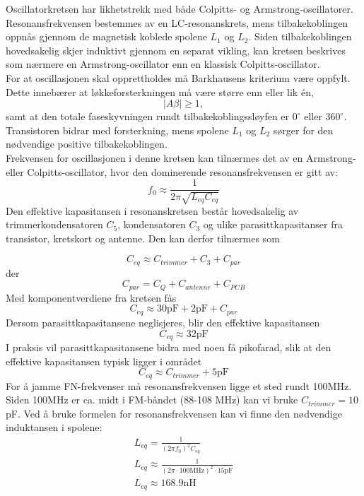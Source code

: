 \noindent
Oscillatorkretsen har likhetstrekk med både Colpitts- og Armstrong-oscillatorer. Resonansfrekvensen bestemmes av en LC-resonanskrets, mens tilbakekoblingen oppnås gjennom de magnetisk koblede spolene $L_1$ og $L_2$. Siden tilbakekoblingen hovedsakelig skjer induktivt gjennom en separat vikling, kan kretsen beskrives som nærmere en Armstrong-oscillator enn en klassisk Colpitts-oscillator.
\\[1em]
For at oscillasjonen skal opprettholdes må Barkhausens kriterium være oppfylt. 
Dette innebærer at løkkeforsterkningen må være større enn eller lik én,
\[
|A\beta| \geq 1,
\]
\noindent
samt at den totale faseskyvningen rundt tilbakekoblingssløyfen er \(0^\circ\) eller \(360^\circ\). Transistoren bidrar med forsterkning, mens spolene \(L_1\) og \(L_2\) sørger for den nødvendige positive tilbakekoblingen.
\\[1em]
Frekvensen for oscillasjonen i denne kretsen kan tilnærmes det av en Armstrong- eller Colpitts-oscillator, hvor den dominerende resonansfrekvensen er gitt av:
\[
f_0 \approx \frac{1}{2\pi \sqrt{L_{eq} C_{eq}}}
\]
\noindent
Den effektive kapasitansen i resonanskretsen består hovedsakelig av trimmerkondensatoren \(C_5\), kondensatoren \(C_3\) og ulike parasittkapasitanser fra transistor, kretskort og antenne. Den kan derfor tilnærmes som

\[
C_{eq} \approx C_{trimmer} + C_3 + C_{par}
\]
\noindent
der
\[
C_{par} = C_{Q} + C_{antenne} + C_{PCB}
\]
\noindent
Med komponentverdiene fra kretsen fås
\[
C_{eq} \approx 30\text{pF} + 2\text{pF} + C_{par}
\]
\noindent
Dersom parasittkapasitansene neglisjeres, blir den effektive kapasitansen
\[
C_{eq} \approx 32\text{pF}
\]
\noindent
I praksis vil parasittkapasitansene bidra med noen få pikofarad, slik at den effektive kapasitansen typisk ligger i området
\[
C_{eq} \approx C_{trimmer} + 5\text{pF}
\]
\noindent
For å jamme FN-frekvenser må resonansfrekvensen ligge et sted rundt 100MHz. Siden 100MHz er ca. midt i FM-båndet (88-108 MHz) kan vi bruke $C_{trimmer} = 10$pF. Ved å bruke formelen for resonansfrekvensen kan vi finne den nødvendige induktansen i spolene:
\begin{gather*}
    L_{eq} = \frac{1}{(2\pi f_0)^2 C_{eq}} \\
    L_{eq} \approx \frac{1}{(2\pi \cdot 100\text{MHz})^2 \cdot 15\text{pF}} \\
    L_{eq} \approx 168.9\text{nH}
\end{gather*}

